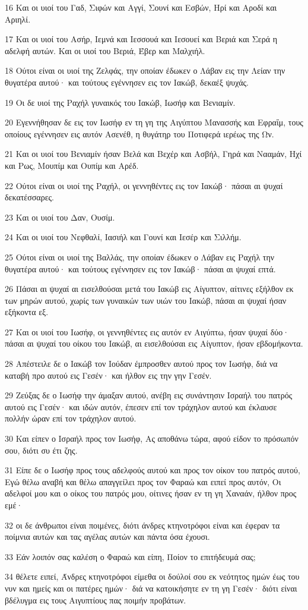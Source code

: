 \par 16 Και οι υιοί του Γαδ, Σιφών και Αγγί, Σουνί και Εσβών, Ηρί και Αροδί και Αριηλί.
\par 17 Και οι υιοί του Ασήρ, Ιεμνά και Ιεσσουά και Ιεσουεί και Βεριά και Σερά η αδελφή αυτών. Και οι υιοί του Βεριά, Έβερ και Μαλχιήλ.
\par 18 Ούτοι είναι οι υιοί της Ζελφάς, την οποίαν έδωκεν ο Λάβαν εις την Λείαν την θυγατέρα αυτού· και τούτους εγέννησεν εις τον Ιακώβ, δεκαέξ ψυχάς.
\par 19 Οι δε υιοί της Ραχήλ γυναικός του Ιακώβ, Ιωσήφ και Βενιαμίν.
\par 20 Εγεννήθησαν δε εις τον Ιωσήφ εν τη γη της Αιγύπτου Μανασσής και Εφραΐμ, τους οποίους εγέννησεν εις αυτόν Ασενέθ, η θυγάτηρ του Ποτιφερά ιερέως της Ων.
\par 21 Και οι υιοί του Βενιαμίν ήσαν Βελά και Βεχέρ και Ασβήλ, Γηρά και Νααμάν, Ηχί και Ρως, Μουπίμ και Ουπίμ και Αρέδ.
\par 22 Ούτοι είναι οι υιοί της Ραχήλ, οι γεννηθέντες εις τον Ιακώβ· πάσαι αι ψυχαί δεκατέσσαρες.
\par 23 Και οι υιοί του Δαν, Ουσίμ.
\par 24 Και οι υιοί του Νεφθαλί, Ιασιήλ και Γουνί και Ιεσέρ και Σιλλήμ.
\par 25 Ούτοι είναι οι υιοί της Βαλλάς, την οποίαν έδωκεν ο Λάβαν εις Ραχήλ την θυγατέρα αυτού· και τούτους εγέννησεν εις τον Ιακώβ· πάσαι αι ψυχαί επτά.
\par 26 Πάσαι αι ψυχαί αι εισελθούσαι μετά του Ιακώβ εις Αίγυπτον, αίτινες εξήλθον εκ των μηρών αυτού, χωρίς των γυναικών των υιών του Ιακώβ, πάσαι αι ψυχαί ήσαν εξήκοντα εξ.
\par 27 Και οι υιοί του Ιωσήφ, οι γεννηθέντες εις αυτόν εν Αιγύπτω, ήσαν ψυχαί δύο· πάσαι αι ψυχαί του οίκου του Ιακώβ, αι εισελθούσαι εις Αίγυπτον, ήσαν εβδομήκοντα.
\par 28 Απέστειλε δε ο Ιακώβ τον Ιούδαν έμπροσθεν αυτού προς τον Ιωσήφ, διά να καταβή προ αυτού εις Γεσέν· και ήλθον εις την γην Γεσέν.
\par 29 Ζεύξας δε ο Ιωσήφ την άμαξαν αυτού, ανέβη εις συνάντησιν Ισραήλ του πατρός αυτού εις Γεσέν· και ιδών αυτόν, έπεσεν επί τον τράχηλον αυτού και έκλαυσε πολλήν ώραν επί τον τράχηλον αυτού.
\par 30 Και είπεν ο Ισραήλ προς τον Ιωσήφ, Ας αποθάνω τώρα, αφού είδον το πρόσωπόν σου, διότι συ έτι ζης.
\par 31 Είπε δε ο Ιωσήφ προς τους αδελφούς αυτού και προς τον οίκον του πατρός αυτού, Εγώ θέλω αναβή και θέλω απαγγείλει προς τον Φαραώ και ειπεί προς αυτόν, Οι αδελφοί μου και ο οίκος του πατρός μου, οίτινες ήσαν εν τη γη Χαναάν, ήλθον προς εμέ·
\par 32 οι δε άνθρωποι είναι ποιμένες, διότι άνδρες κτηνοτρόφοι είναι και έφεραν τα ποίμνια αυτών και τας αγέλας αυτών και πάντα όσα έχουσι.
\par 33 Εάν λοιπόν σας καλέση ο Φαραώ και είπη, Ποίον το επιτήδευμά σας;
\par 34 θέλετε ειπεί, Άνδρες κτηνοτρόφοι είμεθα οι δούλοί σου εκ νεότητος ημών έως του νυν και ημείς και οι πατέρες ημών· διά να κατοικήσητε εν τη γη Γεσέν· διότι είναι βδέλυγμα εις τους Αιγυπτίους πας ποιμήν προβάτων.

